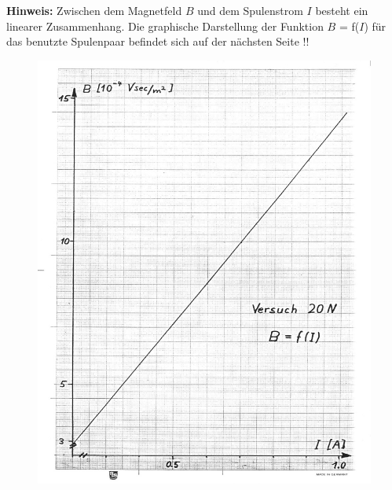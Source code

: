 \textbf{Hinweis:} Zwischen dem Magnetfeld $B$ und dem Spulenstrom $I$ besteht ein linearer Zusammenhang. Die graphische Darstellung der Funktion $B$ = f($I$) für das benutzte Spulenpaar befindet sich auf der nächsten Seite !!

\begin{figure}[h]
	\centering
		\includegraphics[width=1.00\textwidth]{Versuch_19-20/Abbildungen/Eichung-HHSpulen.jpg}
	\label{fig:Eichung-HHSpulen}
\end{figure}
